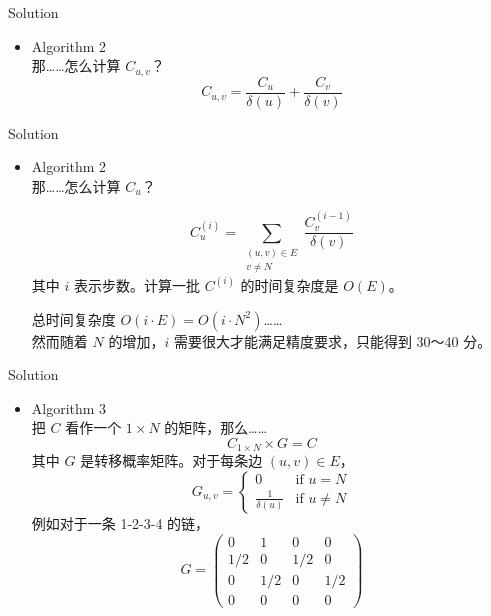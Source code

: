 \documentclass[UTF8]{beamer}
\begin{document}
\begin{frame}{Solution}
\begin{itemize}
    \item Algorithm 2 \\
        那……怎么计算 $C_{u, v}$？
        \pause
        $$
            C_{u, v} = \frac{C_u}{\delta(u)} + \frac{C_v}{\delta(v)}
        $$
\end{itemize}

\end{frame}

\begin{frame}{Solution}
\begin{itemize}
    \item Algorithm 2 \\
        那……怎么计算 $C_u$？

        \pause
        $$
            C_u^{(i)} = \sum_{\substack{(u, v) \in E \\ v \neq N}} \frac{C_v^{(i - 1)}}{\delta(v)}
        $$
        \pause
        其中 $i$ 表示步数。计算一批 $C^{(i)}$ 的时间复杂度是 $O(E)$。

        总时间复杂度 $O(i \cdot E)=O(i \cdot N^2)$…… \\
        然而随着 $N$ 的增加，$i$ 需要很大才能满足精度要求，只能得到 30～40 分。
\end{itemize}

\end{frame}

\begin{frame}{Solution}
\begin{itemize}
    \item Algorithm 3 \\
        把 $C$ 看作一个 $1 \times N$ 的矩阵，那么……
        $$
            C_{1 \times N} \times G = C
        $$
        其中 $G$ 是转移概率矩阵。对于每条边 $(u, v) \in E$，
        \begin{equation*}
            G_{u, v} =
            \begin{cases}
                0   &\mbox{if $u = N$} \\
                \frac{1}{\delta(u)}  &\mbox{if $u \neq N$}
            \end{cases}
        \end{equation*}
        例如对于一条 1-2-3-4 的链，
        $$
            G = \begin{pmatrix} 0 & 1 & 0 & 0 \\ 1/2 & 0 & 1/2 & 0 \\ 0 & 1/2 & 0 & 1/2 \\ 0 & 0 & 0 & 0 \end{pmatrix}
        $$
\end{itemize}

\end{frame}
\end{document}
